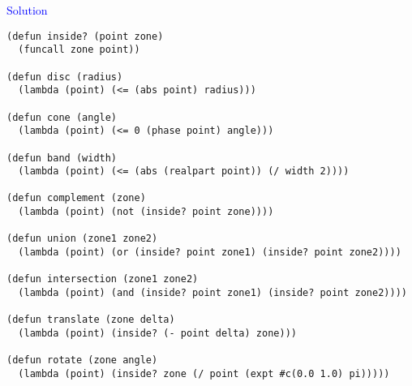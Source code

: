 \documentclass{slides}
\newcommand{\ti}[1]{\begin{center}\Large{\textcolor{blue}{#1}}\end{center}}
\begin{document}
\begin{slide}\ti{Solution}

{\tiny\begin{verbatim}
(defun inside? (point zone)
  (funcall zone point))

(defun disc (radius)
  (lambda (point) (<= (abs point) radius)))

(defun cone (angle)
  (lambda (point) (<= 0 (phase point) angle)))

(defun band (width)
  (lambda (point) (<= (abs (realpart point)) (/ width 2))))

(defun complement (zone)
  (lambda (point) (not (inside? point zone))))

(defun union (zone1 zone2)
  (lambda (point) (or (inside? point zone1) (inside? point zone2))))

(defun intersection (zone1 zone2)
  (lambda (point) (and (inside? point zone1) (inside? point zone2))))

(defun translate (zone delta)
  (lambda (point) (inside? (- point delta) zone)))

(defun rotate (zone angle)
  (lambda (point) (inside? zone (/ point (expt #c(0.0 1.0) pi)))))
\end{verbatim}
}

\vfill\end{slide}


\end{document}
